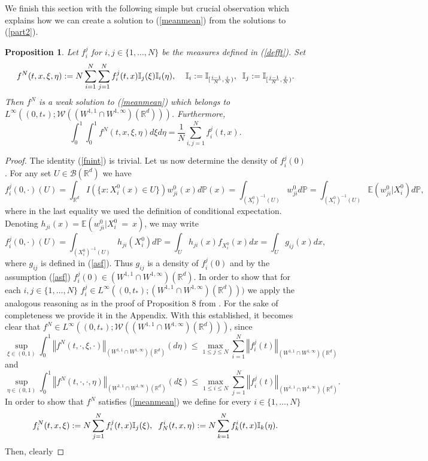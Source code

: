 \documentclass[10pt]{article}
\newtheorem{prop}{Proposition}
\newcommand{\eqq}[2]{\begin{equation}  #1  \label{#2}\end{equation}    }
\newcommand{\hd}{\hspace{0.2cm}}
\newcommand*{\norm}[1]{\left\Vert{#1}\right\Vert}
\newcommand{\R}{\mathbb{R}}
\newcommand{\izj}{\int_{0}^{1}}
\newcommand{\ird}{\int_{\mathbb{R}^d}}
\newcommand{\p}{\mathbb{P}}
\newcommand{\wji}{w_{ji}}
\newcommand{\fji}{f^j_i}
\newcommand{\fik}{f^i_k}
\newcommand{\W}{\mathcal{W}}
\newcommand{\mI}{\mathbb{I}}
\begin{document}
We finish this section with the following simple but crucial observation which explains how we can create a solution to (\ref{meanmean}) from the solutions to (\ref{part2}).
\begin{prop}\label{fn}
Let  $\fji$ for $i,j\in\{1,\dots,N\}$ be the measures defined in (\ref{defft}). Set
\eqq{
f^N(t,x,\xi,\eta):= N\sum_{i=1}^N \sum_{j=1}^N \fji(t,x)\mI_j(\xi)\mI_i(\eta), \hd \hd \mI_i:=\mathbb{I}_{[\frac{i-1}{N},\frac{i}{N})}, \hd\mI_j:=\mathbb{I}_{[\frac{j-1}{N},\frac{j}{N})}.
}
{deffn}
Then $f^N$ is a weak solution to (\ref{meanmean}) which belongs to $L^{\infty}((0,t_{*});\W((W^{1,1}\cap W^{1,\infty})(\R^d)))$. Furthermore, 
\eqq{
\izj\izj f^N(t,x,\xi,\eta)d\xi d\eta = \frac{1}{N}\sum_{i,j=1}^N\fji(t,x).
}{fnint}
\end{prop}
\begin{proof}
The identity (\ref{fnint}) is trivial. 
Let us now determine the density of $f^j_i(0)$. For any set $U \in \mathcal{B}(\R^d)$ we have
\[
f^j_i(0,\cdot)(U)= \ird I(\{x:X^0_{i}(x)\in U\})\wji^0(x)d\p(x)  = \int_{(X_i^0)^{-1}(U)} \wji^0 d\p 
= \int_{(X_i^0)^{-1}(U)} \mathbb{E}(\wji^0|X^0_i)d\p,
\]
where in the last equality we used the definition of conditional expectation. Denoting $h_{ji}(x) = \mathbb{E}(\wji^0|X_i^0~=~x)$, we may write 
\[
f^j_i(0,\cdot)(U)= \int_{(X_i^0)^{-1}(U)} h_{ji}(X^{0}_i)d\p = \int_{U} h_{ji}(x) f_{X^{0}_i}(x)dx = \int_U g_{ij}(x)dx,
\]
where $g_{ij}$ is defined in (\ref{asf}). Thus $g_{ij}$ is a density of $f^j_i(0)$ and by the assumption (\ref{asf}) $f^j_i(0) \in (W^{1,1}\cap W^{1,\infty})(\R^d)$.
In order to show that for each $i,j \in \{1,\dots,N\}$  $f^j_i \in L^{\infty}((0,t_{*});(W^{1,1}\cap W^{1,\infty})(\R^d)))$ we apply the analogous reasoning as in the proof of Proposition 8 from \cite{nasza}. For  the sake of completeness we provide it in the Appendix. With this established, it becomes clear that $f^N \in L^{\infty}((0,t_{*});\W((W^{1,1}\cap W^{1,\infty})(\R^d)))$, since
\[
\sup_{\xi\in(0,1)}\izj \norm{f^N(t,\cdot,\xi,\cdot)}_{(W^{1,1}\cap W^{1,\infty})(\R^d)}(d\eta) \leq \max_{1\leq j \leq N}\sum_{i=1}^N\norm{f^j_i(t)}_{(W^{1,1}\cap W^{1,\infty})(\R^d)}
\]
and
\[
\sup_{\eta\in(0,1)}\izj \norm{f^N(t,\cdot,\cdot,\eta)}_{(W^{1,1}\cap W^{1,\infty})(\R^d)}(d\xi) \leq \max_{1\leq i \leq N}\sum_{j=1}^N\norm{f^j_i(t)}_{(W^{1,1}\cap W^{1,\infty})(\R^d)}.
\]
In order to show that $f^N$ satisfies (\ref{meanmean}) we
 define for every $i\in\{1,\dots,N\}$
\[
f^N_i(t,x,\xi) := N\sum_{j=1}^N\fji(t,x)\mI_j(\xi), \hd f^i_N(t,x,\eta) := N\sum_{k=1}^N\fik(t,x)\mI_k(\eta).
\]
Then, clearly

\end{proof}
\end{document}
